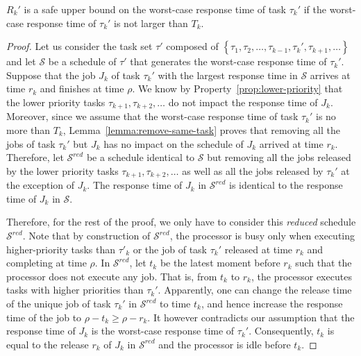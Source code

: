 \begin{theorem}
\label{theorem:critical}
 $R_k'$ is a safe upper bound on the worst-case response time of task $\tau_k'$ if the worst-case response time of $\tau_k'$ is not larger than $T_k$.
\end{theorem}
\begin{proof}
Let us consider the task set $\tau'$ composed of $\left\{\tau_1, \tau_2, \ldots, \tau_{k-1}, \tau_k', \tau_{k+1}, \ldots \right\}$ and let $\mathcal{S}$ be a schedule of $\tau'$ that generates the worst-case response time of $\tau_k'$. Suppose that the job $J_{k}$ of task $\tau_k'$ with the largest response time in $\mathcal{S}$ arrives at time $r_k$ and finishes at time $\rho$. We know by Property~\ref{prop:lower-priority} that the lower priority tasks $\tau_{k+1}, \tau_{k+2}, \ldots$ do not impact the response time of $J_{k}$. Moreover, since we assume that the worst-case response time of task $\tau_k'$ is no more than $T_k$, Lemma~\ref{lemma:remove-same-task} proves that removing all the jobs of task $\tau_k'$ but $J_{k}$ has no impact on the schedule of $J_{k}$ arrived at time $r_k$. Therefore, let $\mathcal{S}^{red}$ be a schedule identical to $\mathcal{S}$ but removing all the jobs released by the lower priority tasks $\tau_{k+1}, \tau_{k+2}, \ldots$ as well as all the jobs released by $\tau_k'$ at the exception of $J_{k}$. The response time of $J_{k}$ in $\mathcal{S}^{red}$ is identical to the response time of $J_{k}$ in $\mathcal{S}$.


Therefore, for the rest of the proof, we only have to consider this \emph{reduced} schedule $\mathcal{S}^{red}$. Note that by construction of $\mathcal{S}^{red}$, the processor is busy only when executing higher-priority tasks than $\tau'_k$ or the job of task $\tau_k'$ released at time $r_k$ and completing at time $\rho$. In $\mathcal{S}^{red}$, let $t_{k}$ be the latest moment before $r_k$ such that the processor does not execute any job. That is, from $t_k$ to $r_k$, the processor executes tasks with higher priorities than $\tau_k'$. Apparently, one can change the release time of the unique job of task $\tau_k'$ in $\mathcal{S}^{red}$ to time $t_k$, and hence increase the response time of the job to $\rho-t_k \geq \rho-r_k$. It however contradicts our assumption that the response time of $J_{k}$ is the worst-case response time of $\tau_k'$. Consequently, $t_k$ is equal to the release $r_k$ of $J_{k}$ in $\mathcal{S}^{red}$ and the processor is idle before $t_k$.


\end{proof}
